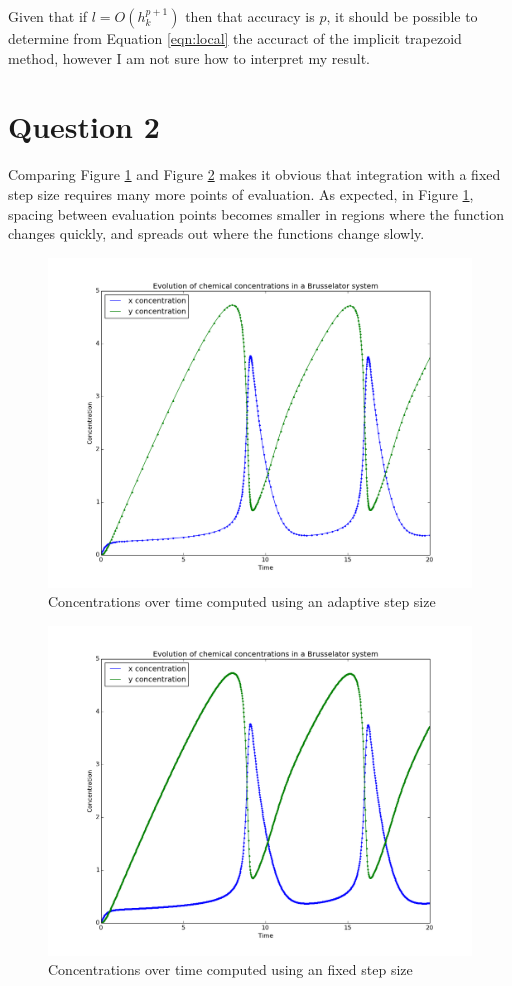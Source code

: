 \documentclass[a4paper,12pt]{article}
\begin{document}
Given that if $l = O(h_k^{p+1})$ then that accuracy is $p$, it should be possible to determine from Equation \ref{eqn:local} the accuract of the implicit trapezoid method, however I am not sure how to interpret my result.

\section{Question 2}

Comparing Figure \ref{fig:q2} and Figure \ref{fig:q2a} makes it obvious that integration with a fixed step size requires many more points of evaluation. As expected, in Figure \ref{fig:q2}, spacing between evaluation points becomes smaller in regions where the function changes quickly, and spreads out where the functions change slowly.

\begin{figure}[H]
\centering
\includegraphics[width = \linewidth]{lab7q2.png}
\caption{Concentrations over time computed using an adaptive step size}
\label{fig:q2}
\end{figure}

\begin{figure}[H]
\centering
\includegraphics[width = \linewidth]{lab7q2additional.png}
\caption{Concentrations over time computed using an fixed step size}
\label{fig:q2a}
\end{figure}
\end{document}
